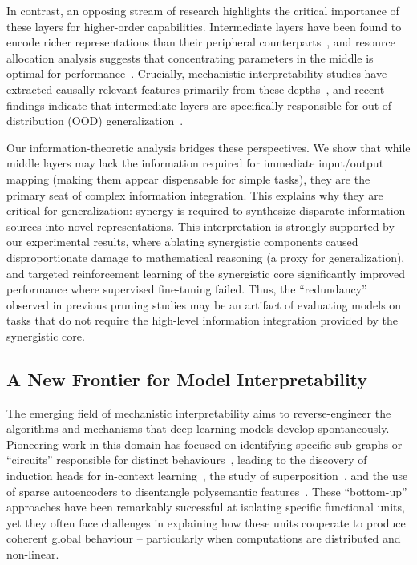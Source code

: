 \documentclass[11pt,a4paper]{ouparticle}
\begin{document}
In contrast, an opposing stream of research highlights the critical importance of these layers for higher-order capabilities. Intermediate layers have been found to encode richer representations than their peripheral counterparts~\cite{skean2025layer}, and resource allocation analysis suggests that concentrating parameters in the middle is optimal for performance~\cite{ikeda2025layerwise}. Crucially, mechanistic interpretability studies have extracted causally relevant features primarily from these depths~\cite{templeton2024scaling}, and recent findings indicate that intermediate layers are specifically responsible for out-of-distribution (OOD) generalization~\cite{uselis2025intermediate}.

Our information-theoretic analysis bridges these perspectives. We show that while middle layers may lack the information required for immediate input/output mapping (making them appear dispensable for simple tasks), they are the primary seat of complex information integration. This explains why they are critical for generalization: synergy is required to synthesize disparate information sources into novel representations. This interpretation is strongly supported by our experimental results, where ablating synergistic components caused disproportionate damage to mathematical reasoning (a proxy for generalization), and targeted reinforcement learning of the synergistic core significantly improved performance where supervised fine-tuning failed. Thus, the ``redundancy'' observed in previous pruning studies may be an artifact of evaluating models on tasks that do not require the high-level information integration provided by the synergistic core.


\subsection*{A New Frontier for Model Interpretability}

The emerging field of mechanistic interpretability aims to reverse-engineer the algorithms and mechanisms that deep learning models develop spontaneously. Pioneering work in this domain has focused on identifying specific sub-graphs or ``circuits'' responsible for distinct behaviours~\cite{cammarata2020thread}, leading to the discovery of induction heads for in-context learning~\cite{olsson2022context}, the study of superposition~\cite{elhage2022superposition}, and the use of sparse autoencoders to disentangle polysemantic features~\cite{bricken2023monosemanticity}. These ``bottom-up'' approaches have been remarkably successful at isolating specific functional units, yet they often face challenges in explaining how these units cooperate to produce coherent global behaviour -- particularly when computations are distributed and non-linear.
\end{document}
